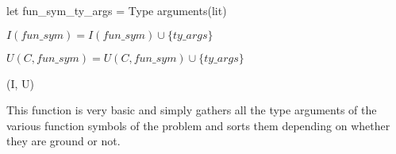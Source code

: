 \documentclass{article}
\begin{document}
\begin{algorithm}[tbh]
\begin{algorithmic}[1]
         \State let fun\_sym\_ty\_args = Type arguments(lit)

            \State \(I(fun\_sym) = I(fun\_sym) \cup \{ty\_args\}\)

         \Else

            \State \(U(C, fun\_sym) = U(C, fun\_sym) \cup \{ty\_args\}\)

         \EndIf
         \EndFor
      \EndFor
   \EndFor

   \State \Return (I, U)

\EndFunction
\end{algorithmic}
\end{algorithm}

This function is very basic and simply gathers all the type arguments of the various function symbols of the problem and sorts them depending on whether they are ground or not.
\end{document}

